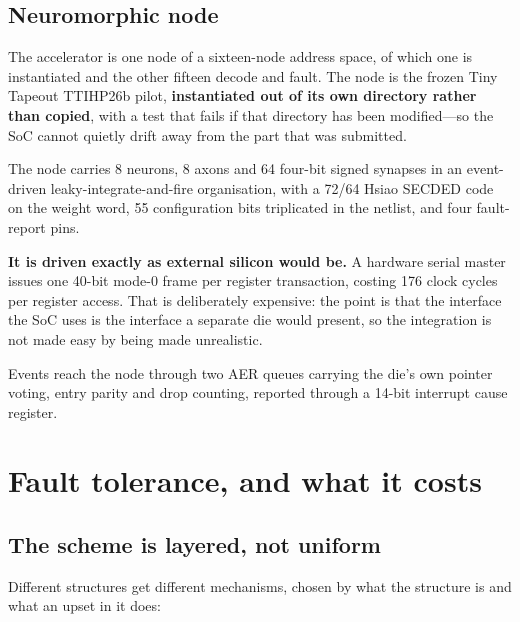 \documentclass[11pt,a4paper]{article}
\begin{document}
\subsection{Neuromorphic node}

The accelerator is one node of a sixteen-node address space, of which
one is instantiated and the other fifteen decode and fault. The node is
the frozen Tiny Tapeout TTIHP26b pilot, \textbf{instantiated out of its
own directory rather than copied}, with a test that fails if that
directory has been modified---so the SoC cannot quietly drift away from
the part that was submitted.

The node carries \num{8} neurons, \num{8} axons and \num{64} four-bit
signed synapses in an event-driven leaky-integrate-and-fire
organisation, with a \num{72}/\num{64} Hsiao SECDED code on the weight
word, \num{55} configuration bits triplicated in the netlist, and four
fault-report pins.

\textbf{It is driven exactly as external silicon would be.} A hardware
serial master issues one \num{40}-bit mode-0 frame per register
transaction, costing \num{176} clock cycles per register access. That is
deliberately expensive: the point is that the interface the SoC uses is
the interface a separate die would present, so the integration is not
made easy by being made unrealistic.

Events reach the node through two AER queues carrying the die's own
pointer voting, entry parity and drop counting, reported through a
\num{14}-bit interrupt cause register.

\section{Fault tolerance, and what it costs}
\label{sec:protect}

\subsection{The scheme is layered, not uniform}

Different structures get different mechanisms, chosen by what the
structure is and what an upset in it does:
\end{document}

